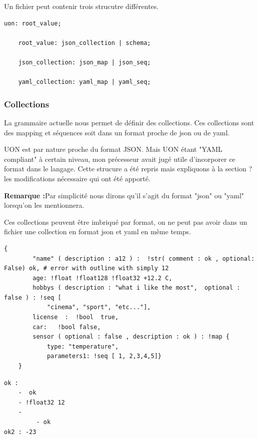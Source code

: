 \documentclass[
    iict, %
    il, %
]{heig-tb}
\begin{document}
Un fichier peut contenir trois strucutre différentes.

\begin{lstlisting}[frame=single,caption={uon-root-value},label={uon-root-value}]
    uon: root_value;

    root_value: json_collection | schema;

    json_collection: json_map | json_seq;

    yaml_collection: yaml_map | yaml_seq;
\end{lstlisting}

\subsubsection{Collections}
La grammaire actuelle nous permet de définir des collections. Ces collections sont des mapping et séquences soit dans un format proche de json ou de yaml.

UON est par nature proche du format JSON. Mais UON étant "YAML compliant" à certain niveau, mon précesseur avait jugé utile d'incorporer ce format
dans le langage. Cette strucure a été repris mais expliquons à la section ? %
les modifications nécessaire qui ont été apporté.

\textbf{Remarque :}Par simplicité nous dirons qu'il s'agit du format "json" ou "yaml" lorsqu'on les mentionnera.

Ces collections peuvent être imbriqué par format, on ne peut pas avoir dans un fichier une collection en format json et yaml en même temps.


\begin{lstlisting}[frame=single,caption={json-map},label={json-map}]
    {
        "name" ( description : a12 ) :  !str( comment : ok , optional: False) ok, # error with outline with simply 12
        age: !float !float128 !float32 +12.2 C,
        hobbys ( description : "what i like the most",  optional : false ) : !seq [
            "cinema", "sport", "etc..."],
        license  :  !bool  true,
        car:   !bool false,
        sensor ( optional : false , description : ok ) : !map {
            type: "temperature",
            parameters1: !seq [ 1, 2,3,4,5]}
    }
\end{lstlisting}

\begin{lstlisting}[frame=single,caption={yaml-map},label={yaml-map}]
ok :
    -  ok
    - !float32 12
    -
         - ok
ok2 : -23
\end{lstlisting}
\end{document}
